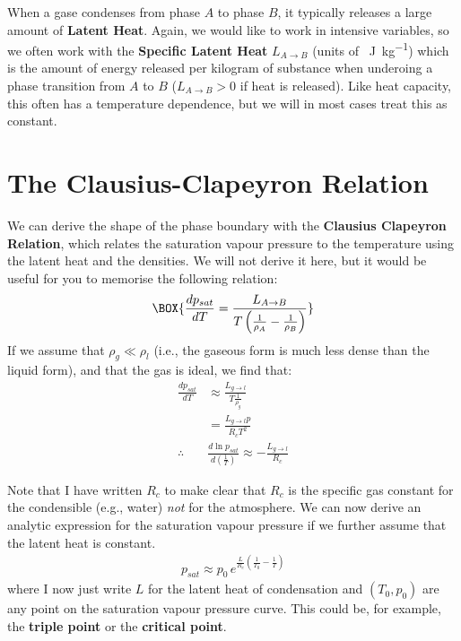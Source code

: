 When a gase condenses from phase \(A\) to phase \(B\), it typically releases a large amount of \textbf{Latent Heat}. Again, we would like to work in intensive variables, so we often work with the \textbf{Specific Latent Heat} \(L_{A\to B}\) (units of \qty{}{\joule\per\kilogram}) which is the amount of energy released per kilogram of substance when underoing a phase transition from \(A\) to \(B\) (\(L_{A\to B}>0\) if heat is released). Like heat capacity, this often has a temperature dependence, but we will in most cases treat this as constant.

\section{The Clausius-Clapeyron Relation}

We can derive the shape of the phase boundary with the \textbf{Clausius Clapeyron Relation}, which relates the saturation vapour pressure to the temperature using the latent heat and the densities. We will not derive it here, but it would be useful for you to memorise the following relation:
\begin{align}\label{Clausius Clapeyron}
    \BOX{
        \frac{dp_{sat}}{dT}=\frac{L_{A\to B}}{T\left(\frac{1}{\rho_A}-\frac{1}{\rho_B}\right)}
        }
\end{align}
If we assume that \(\rho_g\ll\rho_l\) (i.e., the gaseous form is much less dense than the liquid form), and that the gas is ideal, we find that:
\begin{align}
    \frac{d p_{sat}}{dT}&\approx\frac{L_{g\to l}}{T \frac{1}{\rho_g}}\nonumber\\
    & = \frac{L_{g \to l} p}{R_cT^2}\nonumber\\
    \therefore \,\,\,& \boxed{\frac{d \ln p_{sat}}{d \left( \frac{1}{T} \right)} \approx -\frac{L_{g\to l}}{R_c}}\label{Clausius Clapeyron Simplified}
\end{align}

Note that I have written \(R_c\) to make clear that \(R_c\) is the specific gas constant for the condensible (e.g., water) \textit{not} for the atmosphere. We can now derive an analytic expression for the saturation vapour pressure if we further assume that the latent heat is constant. 
\begin{align}
    \boxed{
        p_{sat}\approx p_0 \,e^{\frac{L}{R_c}\left( \frac{1}{T_0}-\frac{1}{T} \right)}
    }
    \label{Sat Vap Pressure}
\end{align}
where I now just write \(L\) for the latent heat of condensation and \((T_0,p_0)\) are any point on the saturation vapour pressure curve. This could be, for example, the \textbf{triple point} or the \textbf{critical point}.

